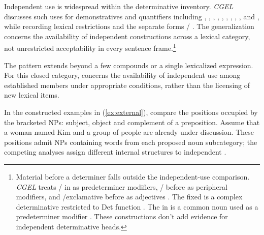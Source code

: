 \documentclass[12pt]{article}
\begin{document}
Independent use is widespread within the determinative inventory. \textit{CGEL} discusses such uses for demonstratives and quantifiers including , , , , , , , , ,  and , while recording lexical restrictions and the separate forms / \citep[371--372, 410--424]{huddleston2002}. The generalization concerns the availability of independent constructions across a lexical category, not unrestricted acceptability in every sentence frame.\footnote{Material before a determiner falls outside the independent-use comparison. \textit{CGEL} treats / in  as predeterminer modifiers, / before  as peripheral modifiers, and /exclamative  before  as adjectives \citep[433--437]{huddleston2002}. The fixed  is a complex determinative restricted to Det function \citep[394]{huddleston2002}. The  in  is a common noun used as a predeterminer modifier \citep[434]{huddleston2002}. These constructions don't add evidence for independent determinative heads.}

The pattern extends beyond a few compounds or a single lexicalized expression. For this closed category,  concerns the availability of independent use among established members under appropriate conditions, rather than the licensing of new lexical items.

In the constructed examples in (\ref{ex:external}), compare the positions occupied by the bracketed NPs: subject, object and complement of a preposition. Assume that a woman named Kim and a group of people are already under discussion. These positions admit NPs containing words from each proposed noun subcategory; the competing analyses assign different internal structures to independent .

\begin{samepage}
\ea\label{ex:external}
\ea {}\qquad {}\qquad {}
\ex {}\qquad {}\qquad {}
\ex {}\qquad {}\qquad {}
\ex {}\qquad {}\qquad {}
\z\z
\end{samepage}
\end{document}
